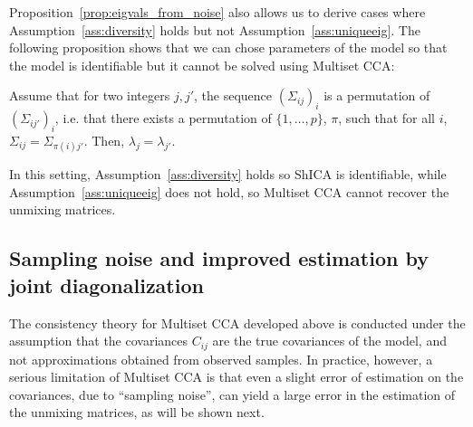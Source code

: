 Proposition~\ref{prop:eigvals_from_noise} also allows us to derive cases where Assumption~\ref{ass:diversity} holds but not Assumption~\ref{ass:uniqueeig}. The following proposition shows that we can chose parameters of the model so that the model is identifiable but it cannot be solved using Multiset CCA:
\begin{proposition}
\label{counter}
Assume that for two integers $j, j'$, the sequence $(\Sigma_{ij})_i$ is a permutation of $(\Sigma_{ij'})_i$, i.e. that there exists a permutation of $\{1,\dots, p\}$, $\pi$, such that for all $i$, $\Sigma_{ij} = \Sigma_{\pi(i)j'}$.  Then, $\lambda_j = \lambda_{j'}$.
\end{proposition}
In this setting, Assumption~\ref{ass:diversity} holds so ShICA is identifiable, while Assumption~\ref{ass:uniqueeig} does not hold, so Multiset CCA cannot recover the unmixing matrices.




\subsection{Sampling noise and improved estimation by joint diagonalization} \label{sec:samplingnoise}


The consistency theory for Multiset CCA developed above is conducted under the assumption that the
covariances $C_{ij}$ are the true covariances of the model, and not
approximations obtained from observed samples. In practice, however, a serious limitation of Multiset CCA is that even a slight error of estimation on the covariances, due to ``sampling noise'', can yield a large error in the estimation of the unmixing matrices, as will be shown next.



